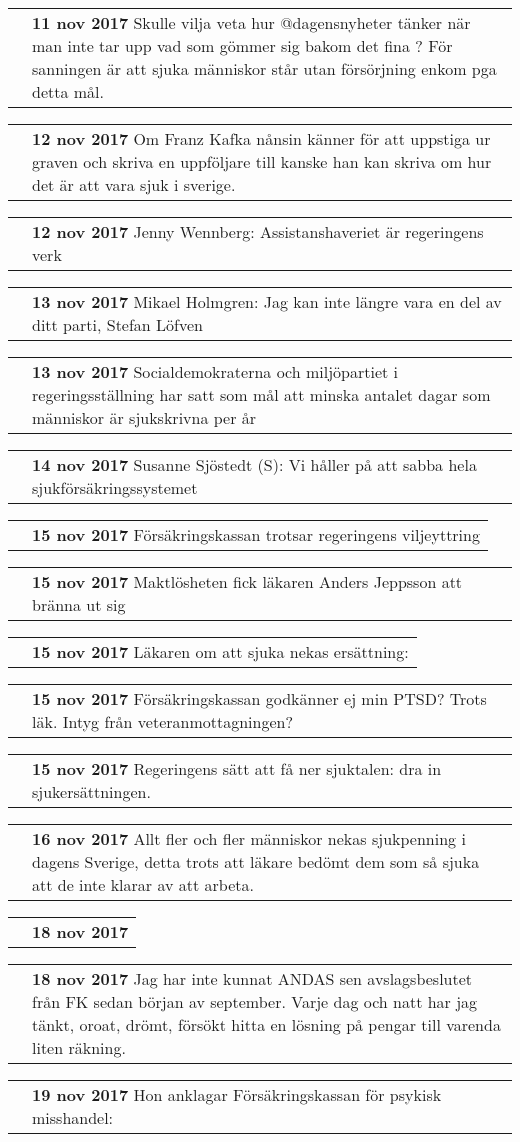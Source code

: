 \documentclass[12pt,a4paper,twocolumn]{article}
\newcommand{\entry}[3]{
\begin{tabular*}{\linewidth}{l m{\linewidth-1.5cm}}
\qrcode[height=1cm]{#3} & \textbf{#1} #2
\end{tabular*}
}
\begin{document}
\entry{11 nov 2017}{Skulle vilja veta hur @dagensnyheter tänker när man inte tar upp vad som gömmer sig bakom det fina \say{lyckats sänka sjuktalen}? För sanningen är att sjuka människor står utan försörjning enkom pga detta mål.}{https://goo.gl/S7ebK5}

\entry{12 nov 2017}{Om Franz Kafka nånsin känner för att uppstiga ur graven och skriva en uppföljare till \say{Processen} kanske han kan skriva om hur det är att vara sjuk i sverige.}{https://goo.gl/eGBAqT}

\entry{12 nov 2017}{Jenny Wennberg: Assistanshaveriet är regeringens verk}{https://goo.gl/dnJwpg}

\entry{13 nov 2017}{Mikael Holmgren: Jag kan inte längre vara en del av ditt parti, Stefan Löfven}{https://goo.gl/EWYsRs}

\entry{13 nov 2017}{Socialdemokraterna och miljöpartiet i regeringsställning har satt som mål att minska antalet dagar som människor är sjukskrivna per år}{https://goo.gl/3m8pyM}

\entry{14 nov 2017}{Susanne Sjöstedt (S): Vi håller på att sabba hela sjukförsäkringssystemet}{https://goo.gl/e64Nmk}

\entry{15 nov 2017}{Försäkringskassan trotsar regeringens viljeyttring}{https://goo.gl/ZjQ95b}

\entry{15 nov 2017}{Maktlösheten fick läkaren Anders Jeppsson att bränna ut sig}{https://goo.gl/sYr7bF}

\entry{15 nov 2017}{Läkaren om att sjuka nekas ersättning: \say{Jag sitter på helgerna och sliter mitt hår}}{https://goo.gl/7xcVHu}

\entry{15 nov 2017}{Försäkringskassan godkänner ej min PTSD? Trots läk. Intyg från veteranmottagningen?}{https://goo.gl/gXwGZ6}

\entry{15 nov 2017}{Regeringens sätt att få ner sjuktalen: dra in sjukersättningen.}{https://goo.gl/Y1cFoM}

\entry{16 nov 2017}{Allt fler och fler människor nekas sjukpenning i dagens Sverige, detta trots att läkare bedömt dem som så sjuka att de inte klarar av att arbeta.}{https://goo.gl/SwnWj6}

\entry{18 nov 2017}{\say{Har du sett på när ett barn sakta dör framför dina ögon?}}{https://goo.gl/5z5pzq}

\entry{18 nov 2017}{Jag har inte kunnat ANDAS sen avslagsbeslutet från FK sedan början av september. Varje dag och natt har jag tänkt, oroat, drömt, försökt hitta en lösning på pengar till varenda liten räkning.}{https://goo.gl/433ToB}

\entry{19 nov 2017}{Hon anklagar Försäkringskassan för psykisk misshandel: \say{Det är som om vi inte skulle vara människor}}{https://goo.gl/ipoBXJ}
\end{document}
